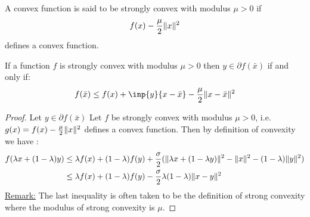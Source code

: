 \begin{definition}
        A convex function is said to be  strongly convex with modulus
	$\mu>0$ if 
        \begin{equation}
          f(x) - \frac{\mu}{2}\lVert x\rVert^2
        \end{equation}
        defines a convex function.\\
\end{definition}

\begin{lemma}
    If a function $f$ is strongly convex with modulus $\mu>0$  then 
  $y\in \partial f(\bar x)$ if and only if:
  \begin{equation}
    f(\bar x) \leq f(x) + \inp{y}{x-\bar x} - \frac{\mu}{2}\norm{x-\bar x}^2
  \end{equation}
  \begin{proof} 
      Let $y \in \partial f(\bar x)$
      Let $f$ be strongly convex with modulus $\mu>0$, i.e. $g(x) = f(x) -
      \frac{\mu}{2}\lVert x\rVert^2$ defines a convex function. Then by definition of convexity 
      we have :
      \begin{align}
	  f(\lambda x + (1-\lambda)y) &\leq \lambda f(x) + (1-\lambda)f(y) 
	  + \frac{\sigma}{2}(\norm{\lambda x + (1-\lambda y)}^2 - \norm{x}^2 -
	  (1-\lambda)\norm{y}^2)\\
%
	  &\leq \lambda f(x) + (1-\lambda)f(y) -
	  \frac{\sigma}{2}\lambda(1-\lambda)\norm{x-y}^2 \label{strong:alternate}
      \end{align}
      \underline{Remark:} The last inequality is often taken to be the definition 
      of strong convexity where the modulus of strong convexity is $\mu$.
      
\end{proof}
\end{lemma}








